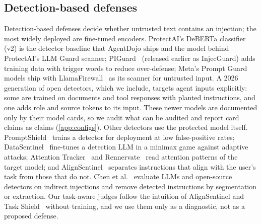 \subsection{Detection-based defenses}
Detection-based defenses decide whether untrusted text contains an injection; the most widely deployed are fine-tuned encoders. ProtectAI's DeBERTa classifier (v2) is the detector baseline that AgentDojo ships and the model behind ProtectAI's LLM Guard scanner; PIGuard~\cite{piguard} (released earlier as InjecGuard) adds training data with trigger words to reduce over-defense; Meta's Prompt Guard models ship with LlamaFirewall~\cite{llamafirewall} as its scanner for untrusted input. A 2026 generation of open detectors, which we include, targets agent inputs explicitly: some are trained on documents and tool responses with planted instructions, and one adds role and source tokens to its input. These newer models are documented only by their model cards, so we audit what can be audited and report card claims as claims (\ref{app:configs}). Other detectors use the protected model itself. PromptShield~\cite{promptshield} trains a detector for deployment at low false-positive rates; DataSentinel~\cite{datasentinel} fine-tunes a detection LLM in a minimax game against adaptive attacks; Attention Tracker~\cite{attentiontracker} and Rennervate~\cite{rennervate} read attention patterns of the target model; and AlignSentinel~\cite{alignsentinel} separates instructions that align with the user's task from those that do not. Chen et al.~\cite{chen2025detected} evaluate LLMs and open-source detectors on indirect injections and remove detected instructions by segmentation or extraction. Our task-aware judges follow the intuition of AlignSentinel and Task Shield~\cite{taskshield} without training, and we use them only as a diagnostic, not as a proposed defense.

